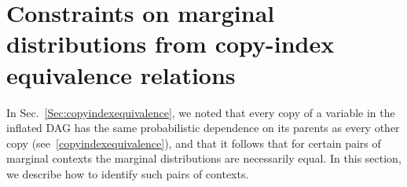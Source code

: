 {\section{Constraints on marginal distributions from copy-index equivalence relations}\label{sec:coincidingdetails}



In Sec.~\ref{Sec:copyindexequivalence}, we noted that every copy of a variable in the inflated DAG has the same probabilistic dependence on its parents as every other copy (see~\cref{copyindexequivalence}), and that it follows that for certain pairs of marginal contexts the marginal distributions are necessarily equal.  In this section, we describe how to identify such pairs of contexts. 


}
